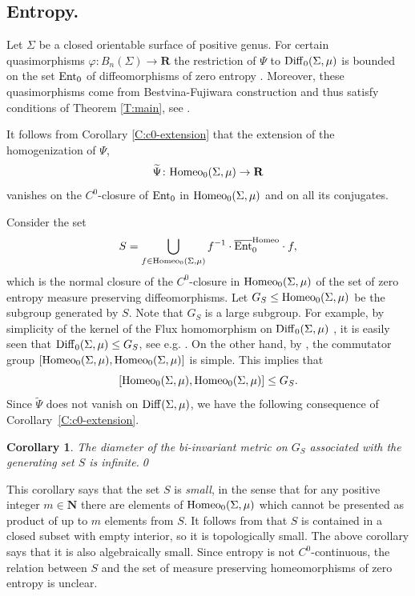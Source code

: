 \documentclass[11pt]{amsart}
\newtheorem{corollary}[subsection]{Corollary}
\theoremstyle{definition}
\theoremstyle{remark}
\numberwithin{equation}{section}
\numberwithin{figure}{section}
\newcommand{\B}[1]{{\mathbf #1}}
\begin{document}
\subsection*{Entropy.}
Let $\Sigma$ be a closed orientable surface of positive genus. For certain 
quasimorphisms $\varphi\colon B_n(\Sigma)\to \B R$ the restriction of
$\Psi$ to ${\rm Diff}_0(\Sigma,\mu)$ is bounded on the set ${\rm Ent}_0$ 
of diffeomorphisms of zero entropy \cite{zbMATH07159382}.
Moreover, these quasimorphisms come from Bestvina-Fujiwara construction and thus satisfy
conditions of Theorem \ref{T:main}, see \cite{zbMATH07159382}. 

It follows from Corollary \ref{C:c0-extension}
that the extension of the homogenization of $\Psi$,
$$\widetilde{\Psi}\colon {\rm Homeo}_0(\Sigma,\mu)\to \B R$$  
vanishes on the $C^0$-closure of ${\rm Ent}_0$ in ${\rm Homeo}_0(\Sigma,\mu)$
and on all its conjugates. 

Consider the set
$$
S = \bigcup_{f\in {\rm Homeo}_0(\Sigma,\mu)} f^{-1}\cdot \overline{\rm Ent}_0^{\rm Homeo}\cdot f,
$$
which is the normal closure of the $C^0$-closure in ${\rm Homeo}_0(\Sigma,\mu)$ of
the set of zero entropy measure preserving diffeomorphisms. Let $G_S \leq {\rm Homeo}_0(\Sigma, \mu)$ be the subgroup generated by $S.$ Note that $G_S$ is a large subgroup. For example, by simplicity of the kernel of the Flux homomorphism on  ${\rm Diff}_0(\Sigma,\mu)$ \cite{zbMATH01002916}, it is easily seen that ${\rm Diff}_0(\Sigma,\mu) \leq G_S$, see e.g. \cite{zbMATH07159382}. 
On the other hand, by \cite[Theorem 1.10]{CGHMSS}, 
the commutator group $[{\rm Homeo}_0(\Sigma, \mu), {\rm Homeo}_0(\Sigma, \mu)]$ is simple. This implies that 
$$[{\rm Homeo}_0(\Sigma, \mu), {\rm Homeo}_0(\Sigma, \mu)] \leq G_S.$$ 
Since $\widetilde{\Psi}$ does not vanish on ${\rm Diff}(\Sigma,\mu)$,
we have the following consequence of Corollary~\ref{C:c0-extension}.

\begin{corollary}\label{C:ent-metric}
The diameter of the bi-invariant metric on $G_S$ associated with the generating set $S$ is infinite.\qed
\end{corollary}

This corollary says that the set $S$ is {\it small}, in the sense that for any
positive integer $m\in \B N$ there are elements of ${\rm Homeo}_0(\Sigma,\mu)$ which
cannot be presented as product of up to $m$ elements from $S$. It follows from
\cite{zbMATH03676775} that $S$ is contained in a closed subset with empty interior, so it
is topologically small. The above corollary says that it is also algebraically
small. Since entropy is not $C^0$-continuous, the relation between $S$ and
the set of measure preserving homeomorphisms of zero entropy is unclear.
\end{document}
